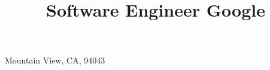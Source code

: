 \title{\normalsize
	Software Engineer\newline
	Google
}                       %
\address{1600 Amphitheatre Pkwy\\Attn Gdinatale\\}{Mountain View, CA, 94043}    %




\newcommand{\see}[1]{\hfill{\itshape\color{see}\footnotesize{}see #1}}

\newcommand{\br}{\ifinner, \else\\\fi}

\newcommand{\gh}[3]{\href{https://github.com/#1/#2/commits?author=dinatale2}{#3}}
\newcommand{\ghllnl}[2]{\gh{llnl}{#1}{#2}}
\newcommand{\ghzfs}[2]{\gh{zfsonlinux}{#1}{#2}}
\newcommand{\ghopensfs}[2]{\gh{opensfs}{#1}{#2}}
\newcommand{\lustre}[0]{\href{https://review.whamcloud.com/\#/q/owner:dinatale2@llnl.gov+status:merged}{Lustre}}

\makeatletter
\def\@bibitem#1{%
	\def\mykey{#1}%
	\item\if@filesw\immediate\write\@auxout {\string\bibcite{#1}%
	{\the\value{\@listctr}}}\fi\ignorespaces}

